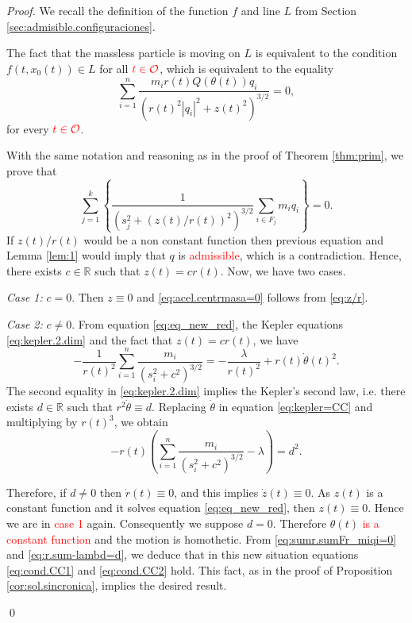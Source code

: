 \documentclass[smallcondensed]{svjour3}
\newcommand{\rr}{\mathbb{R}}
\begin{document}
\begin{proof}
 We recall the definition of the function $f$ and line $L$ from  Section \ref{sec:admisible.configuraciones}.

The fact that the massless particle is moving on $L$ is equivalent to the condition $f(t,x_0(t))\in L$ for all $\textcolor{red}{t\in\mathcal{O}}$,
which is equivalent to the equality
\begin{equation}\label{eq:z/r}
 \sum_{i=1}^n\frac{m_ir(t)Q(\theta (t))q_i}{\left(r(t)^2|q_i|^2+z(t)^2\right)^{3/2}}=0,
\end{equation}
for every $\textcolor{red}{t\in\mathcal{O}}$.

With the same notation and reasoning as in the proof of Theorem \ref{thm:prim}, we prove that
\begin{equation}\label{eq:sumr.sumFr_miqi=0}
\sum_{j=1}^k\left\{\frac{1}{(s_j^{2}+(z(t)/r(t))^2)^{3/2}}\sum_{i\in F_j}m_iq_i\right\}=0.
\end{equation}
If $z(t)/r(t)$  would be a non constant function then previous equation and Lemma \ref{lem:1} would imply that $q$ is \textcolor{red}{admissible}, which is a contradiction. Hence, there exists $c\in \rr$ such that $z(t)=cr(t)$. Now, we have two cases.

\emph{Case 1:} $c=0$. Then $z\equiv 0$ and \eqref{eq:acel.centrmasa=0} follows from \eqref{eq:z/r}.

\emph{Case 2:} $c\neq 0$. From equation \eqref{eq:eq_new_red}, the Kepler equations \eqref{eq:kepler.2.dim} and the fact that $z(t)=cr(t)$, we have 
\begin{equation}\label{eq:kepler=CC}
 -\frac{1}{r(t)^2}\sum_{i=1}^{n}\frac{m_i}{(s_i^2+c^2)^{3/2}}=-\frac{\lambda}{r(t)^2}+r(t)\dot{\theta}(t)^2.
\end{equation}
The second equality in \eqref{eq:kepler.2.dim} implies the Kepler's second law, i.e. there exists $d\in\rr$ such that $r^2\dot{\theta}\equiv d$. Replacing $\dot{\theta}$ in equation \eqref{eq:kepler=CC} and multiplying by $r(t)^3$, we obtain
\begin{equation}\label{eq:r.sum-lambd=d}
-r(t)\left(\sum_{i=1}^{n}\frac{m_i}{(s_i^2+c^2)^{3/2}}-\lambda\right)=d^2.
\end{equation}

Therefore, if $d\neq 0$ then $\dot{r}(t)\equiv 0$, and this implies $\dot{z}(t)\equiv 0$. As $z(t)$ is a constant function and it solves equation \eqref{eq:eq_new_red}, then $z(t)\equiv 0$. Hence we are in \textcolor{red}{ case 1} again. Consequently we suppose $d=0$. Therefore $\theta(t)$ \textcolor{red}{is a constant function} and the motion is homothetic. From \eqref{eq:sumr.sumFr_miqi=0} and \eqref{eq:r.sum-lambd=d}, we deduce that in this new situation equations \eqref{eq:cond.CC1} and \eqref{eq:cond.CC2} hold. This fact, as in the proof of Proposition \ref{cor:sol.sincronica}, implies the desired result.

\qed\end{proof}
\end{document}
